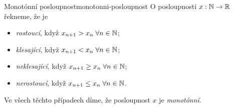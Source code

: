 \begin{definition}{Monotónní posloupnost}{monotonni-posloupnost}
 O posloupnosti $x:\mathbb{N} \to \mathbb{R}$ řekneme, že je
 \begin{itemize}
  \item \emph{rostoucí}, když $x_{n+1}>x_n \; \forall n \in \mathbb{N}$;
  \item \emph{klesající}, když $x_{n+1} < x_n \; \forall n \in \mathbb{N}$;
  \item \emph{neklesající}, když $x_{n+1} \geq x_n \; \forall n \in \mathbb{N}$;
  \item \emph{nerostoucí}, když $x_{n+1} \leq x_n \; \forall n \in \mathbb{N}$.
 \end{itemize}
 Ve všech těchto případech díme, že posloupnost $x$ je \emph{monotónní}.
\end{definition}

